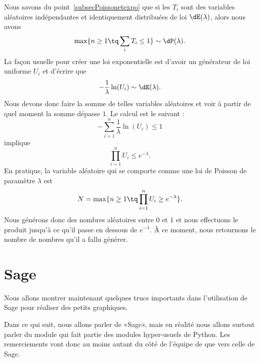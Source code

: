 Nous savons du point~\ref{subsecPoissonetexpo} que si les \( T_i\) sont des variables aléatoires indépendantes et identiquement distribuées de loi \( \dE(\lambda)\), alors nous avons
\begin{equation}
	\max\{ n\geq 1\tq\sum_iT_i\leq 1 \}\sim\dP(\lambda).
\end{equation}
La façon usuelle pour créer une loi exponentielle est d'avoir un générateur de loi uniforme \( U_i\) et d'écrire que
\begin{equation}
	-\frac{1}{ \lambda }\ln(U_i)\sim \dE(\lambda).
\end{equation}
Nous devons donc faire la somme de telles variables aléatoires et voir à partir de quel moment la somme dépasse \( 1\). Le calcul est le suivant :
\begin{equation}
	-\sum_{i=1}^{n}\frac{1}{ \lambda }\ln(U_i)\leq 1
\end{equation}
implique
\begin{equation}
	\prod_{i=1}^nU_i\leq  e^{-\lambda}.
\end{equation}
En pratique, la variable aléatoire qui se comporte comme une loi de Poisson de paramètre \( \lambda\) est
\begin{equation}
	N=\max\{ n\geq 1\tq \prod_{i=1}^nU_i\geq e^{-\lambda} \}.
\end{equation}
Nous générons donc des nombres aléatoires entre \( 0\) et \( 1\) et nous effectuons le produit jusqu'à ce qu'il passe en dessous de \(  e^{-\lambda}\). À ce moment, nous retournons le nombre de nombres qu'il a fallu générer.

\section{Sage}

Nous allons montrer maintenant quelques trucs importants dans l'utilisation de Sage pour réaliser des petits graphiques.

\begin{remark}
	Dans ce qui suit, nous allons parler de «Sage», mais en réalité nous allons surtout parler du module  qui fait partie des modules hyper-usuels de Python. Les remerciements vont donc au moins autant du côté de l'équipe de  que vers celle de Sage.
\end{remark}

